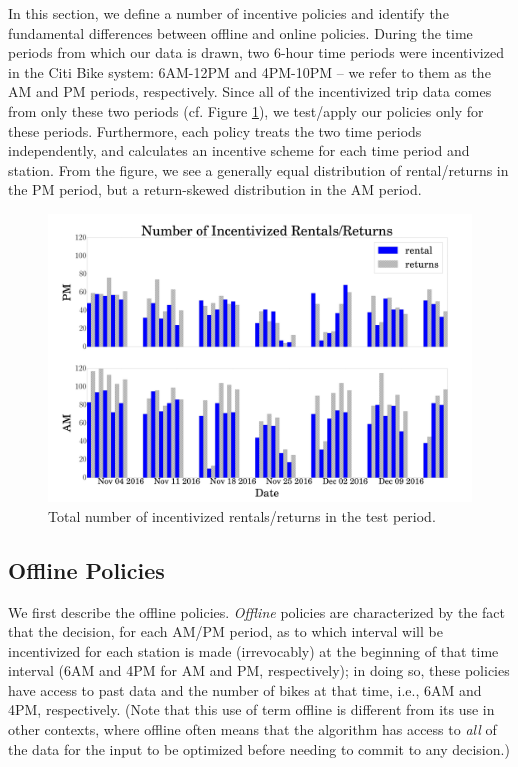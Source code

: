 In this section, we define a number of incentive policies and identify the fundamental differences between offline and online policies.  During the time periods from which our data is drawn, two 6-hour time periods were incentivized in the Citi Bike system: 6AM-12PM and 4PM-10PM -- we refer to them as the AM and PM periods, respectively.  Since all of the incentivized trip data comes from only these two periods (cf. Figure \ref{fig:Incentivized Rentals/Returns}), we test/apply our policies only for these periods. Furthermore, each policy treats the two time periods independently, and calculates an incentive scheme for each time period and station. From the figure, we see a generally equal distribution of rental/returns in the PM period, but a return-skewed distribution in the AM period. 

\begin{figure}
\centering
\includegraphics[width=.5\textwidth]{../SubmissionPlots/ActuallyUsed/Rental_Return.png}
\caption{Total number of incentivized rentals/returns in the test period.}
\label{fig:Incentivized Rentals/Returns}
\end{figure}


\subsection{Offline Policies}

We first describe the offline policies. \emph{Offline} policies are characterized by the fact that the decision, for each AM/PM period, as to which interval will be incentivized for each station is made (irrevocably) at the beginning of that time interval (6AM and 4PM for AM and PM, respectively); in doing so, these policies have access to past data and the number of bikes at that time, i.e., 6AM and 4PM, respectively. %
(Note that this use of term offline is different from its use in other contexts, where offline often means that the algorithm has access to {\it all} of the data for the input to be optimized before needing to commit to any decision.) 

